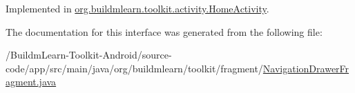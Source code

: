 Implemented in \hyperlink{classorg_1_1buildmlearn_1_1toolkit_1_1activity_1_1HomeActivity_af75c80f626f8c3a7141c046108ff229f}{org.\-buildmlearn.\-toolkit.\-activity.\-Home\-Activity}.



The documentation for this interface was generated from the following file\-:\begin{DoxyCompactItemize}
\item 
/\-Buildm\-Learn-\/\-Toolkit-\/\-Android/source-\/code/app/src/main/java/org/buildmlearn/toolkit/fragment/\hyperlink{NavigationDrawerFragment_8java}{Navigation\-Drawer\-Fragment.\-java}\end{DoxyCompactItemize}

